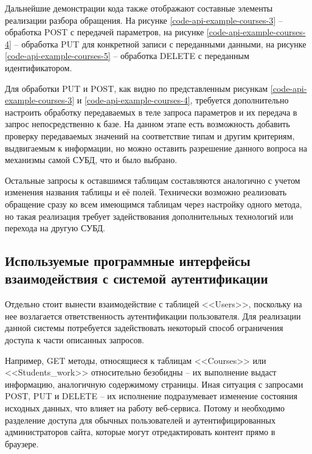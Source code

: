 Дальнейшие демонстрации кода также отображают составные элементы реализации разбора обращения.
На рисунке \ref{code-api-example-courses-3} -- обработка POST с передачей параметров, на рисунке \ref{code-api-example-courses-4} -- обработка PUT для конкретной записи с переданными данными,
на рисунке \ref{code-api-example-courses-5} -- обработка DELETE с переданным идентификатором.



Для обработки PUT и POST, как видно по представленным рисункам \ref{code-api-example-courses-3} и \ref{code-api-example-courses-4}, требуется дополнительно настроить обработку передаваемых в теле запроса параметров и их передача в запрос непосредственно к базе.
На данном этапе есть возможность добавить проверку передаваемых значений на соответствие типам и другим критериям, выдвигаемым к информации, но можно оставить разрешение данного вопроса на механизмы самой СУБД, что и было выбрано.


Остальные запросы к оставшимся таблицам составляются аналогично с учетом изменения названия таблицы и её полей.
Технически возможно реализовать обращение сразу ко всем имеющимся таблицам через настройку одного метода, но такая реализация требует задействования дополнительных технологий или перехода на другую СУБД.

\subsection{Используемые программные интерфейсы взаимодействия с системой аутентификации}

Отдельно стоит вынести взаимодействие с таблицей <<Users>>, поскольку на нее возлагается ответственность аутентификации пользователя.
Для реализации данной системы потребуется задействовать некоторый способ ограничения доступа к части описанных запросов.

Например, GET методы, относящиеся к таблицам <<Courses>> или <<Students\_work>> относительно безобидны -- их выполнение выдаст информацию, аналогичную содержимому страницы.
Иная ситуация с запросами POST, PUT и DELETE -- их исполнение подразумевает изменение состояния исходных данных, что влияет на работу веб-сервиса.
Потому и необходимо разделение доступа для обычных пользователей и аутентифицированных администраторов сайта, которые могут отредактировать контент прямо в браузере.

